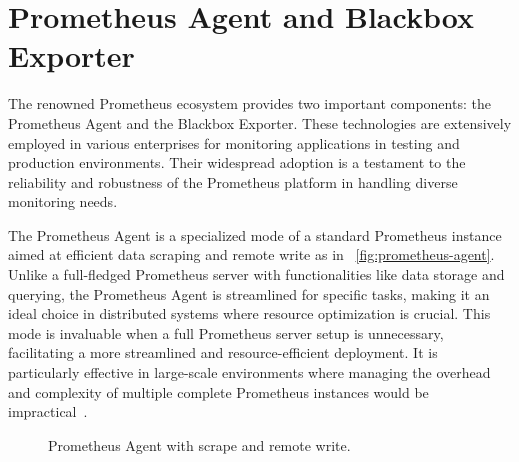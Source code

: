 \section{Prometheus Agent and Blackbox Exporter}

The renowned Prometheus ecosystem provides two important components: the Prometheus Agent and the Blackbox Exporter. These technologies are extensively employed in various enterprises for monitoring applications in testing and production environments. Their widespread adoption is a testament to the reliability and robustness of the Prometheus platform in handling diverse monitoring needs.

The Prometheus Agent is a specialized mode of a standard Prometheus instance aimed at efficient data scraping and remote write as in ~\autoref{fig:prometheus-agent}. Unlike a full-fledged Prometheus server with functionalities like data storage and querying, the Prometheus Agent is streamlined for specific tasks, making it an ideal choice in distributed systems where resource optimization is crucial. This mode is invaluable when a full Prometheus server setup is unnecessary, facilitating a more streamlined and resource-efficient deployment. It is particularly effective in large-scale environments where managing the overhead and complexity of multiple complete Prometheus instances would be impractical~\parencite{prometheusIntroducingPrometheusAgent}.

\begin{figure}[htpb]
    \centering
    \caption[Prometheus Agent]{Prometheus Agent with scrape and remote write.}\label{fig:prometheus-agent}
\end{figure}

